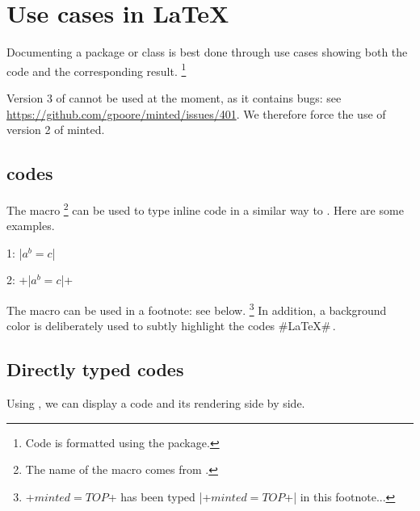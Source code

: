 \section{Use cases in \LaTeX}

Documenting a package or class is best done through use cases showing both the code and the corresponding result.
\footnote{
	Code is formatted using the  package.
}


\begin{tdocwarn}
	Version 3 of  cannot be used at the moment, as it contains bugs: see \url{https://github.com/gpoore/minted/issues/401}. We therefore force the use of version 2 of minted.

\end{tdocwarn}


\subsection{ codes} \label{tdoc-listing-inline}

The  macro
\footnote{
    The name of the macro  comes from .
}
can be used to type inline code in a similar way to .
Here are some examples.


\begin{tdoclatex}[sbs]
    1: \tdocinlatex|$a^b = c$|

    2: \tdocinlatex+\tdocinlatex|$a^b = c$|+
\end{tdoclatex}


\begin{tdocnote}
    The  macro can be used in a footnote: see below.
    \footnote{
        \tdocinlatex+$minted = TOP$+ has been typed \tdocinlatex|\tdocinlatex+$minted = TOP$+| in this footnote...
    }
    In addition, a background color is deliberately used to subtly highlight the codes \tdocinlatex#\LaTeX#\,.
\end{tdocnote}




\subsection{Directly typed codes}

\begin{tdocexa}
    Using , we can display a code and its rendering side by side.

\end{tdocexa}


